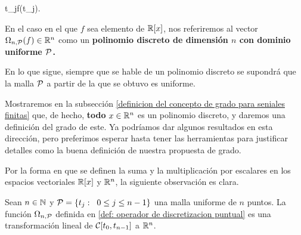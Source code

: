 \begin{center}
{}
{\IR }
{t_{j}}{f(t_{j}).}
\end{center}



\begin{defi} \label{def: polinomio discreto}
En el caso en el que $f$ sea elemento de $\mathbb{R}[x]$, 
nos referiremos
al vector $\Omega_{n,\mathcal{P}}(f) \in \mathbb{R}^{n}$
como un \textbf{polinomio discreto
de dimensión $n$ con dominio uniforme $\mathcal{P}$.} 

\begin{nota}
En lo que sigue, siempre que se hable de un polinomio
discreto
se supondrá que la malla $\mathcal{P}$
a partir de la que se obtuvo es uniforme.
\end{nota}
\end{defi} 

Mostraremos en la subsección
\ref{definicion del concepto de grado para seniales finitas}
que, de hecho, \textbf{todo}
$x \in \mathbb{R}^{n}$ es un polinomio discreto,
y daremos una definición del grado de este.
Ya podríamos dar algunos resultados en esta dirección,
pero preferimos esperar hasta tener las herramientas
para justificar detalles como la buena definición
de nuestra propuesta de grado.


Por la forma en que se definen la suma y la multiplicación
por escalares en los espacios vectoriales $\mathbb{R}[x]$
y $\mathbb{R}^{n}$, la siguiente observación es clara.

\begin{obs} \label{obs:linealidad de omega restringida a R[x]}
Sean $n \in \mathbb{N}$ y $\mathcal{P}=\{t_{j}:
\hspace{0.2cm}0 \leq j \leq n-1 \}$ una malla uniforme
de $n$ puntos.
La función $\Omega_{n , \mathcal{P}}$ 
definida en 
\ref{def: operador de discretizacion puntual}
es una transformación lineal de 
$\mathcal{C}[t_{0}, t_{n-1}]$ a $\mathbb{R}^{n}$.
\end{obs}
 


